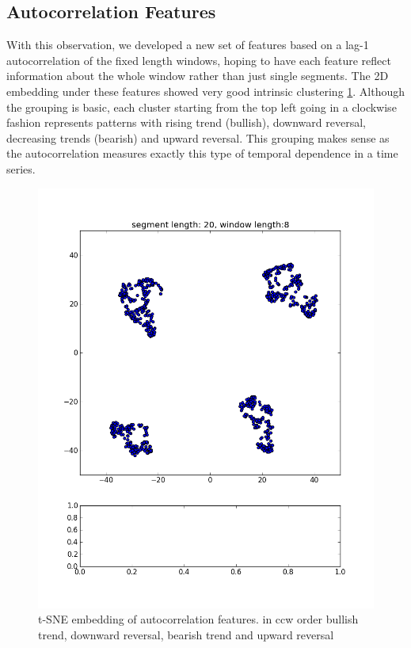 \documentclass{article} %
\begin{document}
\subsection{Autocorrelation Features}
With this observation, we developed a new set of features based on a lag-1 autocorrelation of the fixed length windows, hoping to have each feature reflect information about the whole window rather than just single segments. The 2D embedding under these features showed very good intrinsic clustering \ref{fig:aapl-clustered}. Although the grouping is basic, each cluster starting from the top left going in a clockwise fashion represents patterns with rising trend (bullish), downward reversal, decreasing trends (bearish) and upward reversal. This grouping makes sense as the autocorrelation measures exactly this type of temporal dependence in a time series.
\begin{figure}[h]
\begin{center}
\includegraphics[width=1\textwidth]{aapl-clustered.png}
\end{center}
\caption{t-SNE embedding of autocorrelation features. in ccw order bullish trend, downward reversal, bearish trend and upward reversal\label{fig:aapl-clustered}}
\end{figure}
\end{document}
